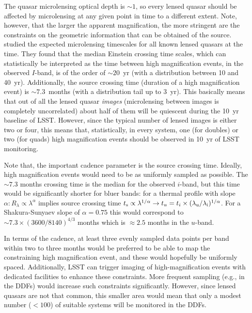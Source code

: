 The quasar microlensing optical depth is $\sim1$, so every lensed quasar should 
be affected by microlensing at any given point in time to a different extent. 
Note, however, that the larger the apparent magnification, the more stringent are
the constraints on the geometric information that can be obtained of the source. 
\citet{MosqueraandKochanek2011} studied the expected microlensing 
timescales for all known lensed quasars at the time. They found that the median 
Einstein crossing time scales, which can statistically be interpreted as the 
time between high magnification events, in the observed $I$-band, is of the order 
of $\sim20$~yr (with a distribution between 10 and 40~yr). Additionally, the source 
crossing time (duration of a high magnification event) is $\sim7.3$~months (with 
a distribution tail up to 3~yr). This basically means that out of all the lensed 
quasar {\em images} (microlensing between images is completely uncorrelated) 
about half of them will be quiescent during the 10~yr baseline of LSST. However, 
since the typical number of lensed images is either two or four, this means 
that, statistically, in every system, one (for doubles) or two (for quads) high 
magnification events should be observed in 10~yr of LSST monitoring. 

Note that, the important cadence parameter is the source crossing time. Ideally, 
high magnification events would need to be as uniformly sampled as possible. The 
$\sim 7.3$ months crossing time is the median for the observed $i$-band, but this time 
would be significantly shorter for bluer bands: for a thermal profile with slope 
$\alpha: R_\lambda \propto \lambda^\alpha$ implies source crossing time $t_{\rm 
s} \propto \lambda^{1/\alpha} \rightarrow t_u=t_i \times (\lambda_{\rm u} / 
\lambda_{\rm i})^{1/\alpha}$. For a Shakura-Sunyaev slope of $\alpha=0.75$ this 
would correspond to $\sim 7.3 \times (3600/8140)^{4/3}$ months which is $\approx 2.5$ 
months in the $u$-band.

In terms of the cadence, at least three evenly sampled data points per band 
within two to three months would be preferred to be able to map the constraining 
high magnification event, and these would hopefully be uniformly spaced.
Additionally, LSST can trigger imaging of high-magnification events with dedicated
facilities to enhance these constraints. More frequent sampling (e.g., in the DDFs)
would increase such constraints significantly. However, since lensed quasars are not
that common, this smaller area would mean that only a modest number ($<100$)
of suitable systems will be monitored in the DDFs.

